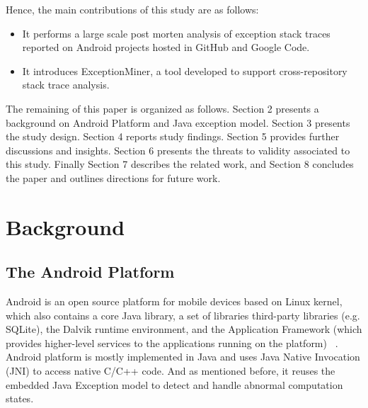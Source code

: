 \documentclass[conference]{IEEEtran}
\begin{document}
Hence, the main contributions of this study are as follows:
\begin{itemize}

  \item  It performs a large scale post morten analysis of exception stack traces reported on Android projects hosted in GitHub and Google Code.

  \item  It introduces ExceptionMiner, a tool developed to support cross-repository stack trace
    analysis.

\end{itemize}



The remaining of this paper is organized as follows. Section 2 presents a
background on Android Platform and Java exception model. 
Section 3 presents the study design. Section 4 reports study findings. 
Section 5 provides further discussions and insights.
Section 6 presents the threats to validity associated to this study. Finally Section
7 describes the related work, and Section 8 concludes the paper and outlines
directions for future work.

\section{Background}
\label{sec:back}

\subsection{The Android Platform} \label{sec:extypes}

Android is an open source platform for mobile devices based on Linux kernel,
which also contains  a core Java library, a set of libraries third-party libraries (e.g.  SQLite),
the Dalvik runtime environment, and the Application Framework (which provides 
higher-level services to the applications running on the platform) ~\cite{andguide}.
Android platform is mostly implemented in Java and uses Java Native Invocation (JNI) to access native C/C++ code. 
And as mentioned before, it reuses the embedded Java Exception model to detect and handle 
abnormal computation states.
\end{document}
